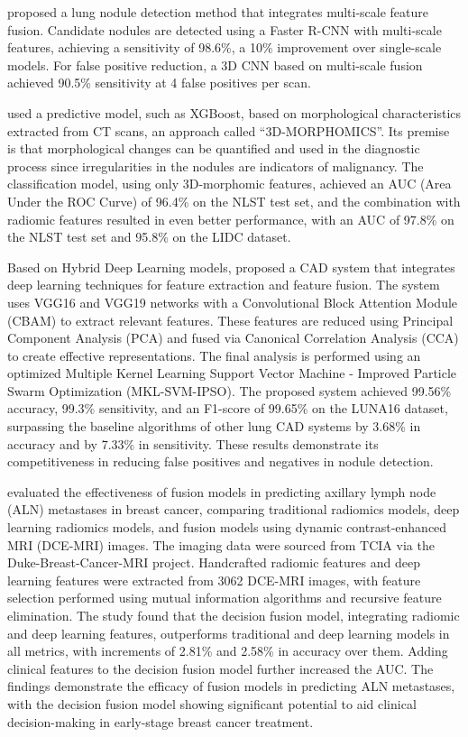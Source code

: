 \citet{Zhao2022} proposed a lung nodule detection method that integrates multi-scale feature fusion. Candidate nodules are detected using a Faster R-CNN with multi-scale features, achieving a sensitivity of 98.6\%, a 10\% improvement over single-scale models. For false positive reduction, a 3D CNN based on multi-scale fusion achieved 90.5\% sensitivity at 4 false positives per scan.


\citet{Munoz2022} used a predictive model, such as XGBoost, based on morphological characteristics extracted from CT scans, an approach called “3D-MORPHOMICS”. Its premise is that morphological changes can be quantified and used in the diagnostic process since irregularities in the nodules are indicators of malignancy. The classification model, using only 3D-morphomic features, achieved an AUC (Area Under the ROC Curve) of 96.4\% on the NLST test set, and the combination with radiomic features resulted in even better performance, with an AUC of 97.8\% on the NLST test set and 95.8\% on the LIDC dataset.

Based on Hybrid Deep Learning models, \citet{Li2022} proposed a CAD system that integrates deep learning techniques for feature extraction and feature fusion. The system uses VGG16 and VGG19 networks with a Convolutional Block Attention Module (CBAM) to extract relevant features. These features are reduced using Principal Component Analysis (PCA) and fused via Canonical Correlation Analysis (CCA) to create effective representations. The final analysis is performed using an optimized Multiple Kernel Learning Support Vector Machine - Improved Particle Swarm Optimization (MKL-SVM-IPSO). The proposed system achieved 99.56\% accuracy, 99.3\% sensitivity, and an F1-score of 99.65\% on the LUNA16 dataset, surpassing the baseline algorithms of other lung CAD systems by 3.68\% in accuracy and by 7.33\% in sensitivity. These results demonstrate its competitiveness in reducing false positives and negatives in nodule detection.

\citet{XueLi2022} evaluated the effectiveness of fusion models in predicting axillary lymph node (ALN) metastases in breast cancer, comparing traditional radiomics models, deep learning radiomics models, and fusion models using dynamic contrast-enhanced MRI (DCE-MRI) images. The imaging data were sourced from TCIA via the Duke-Breast-Cancer-MRI project. Handcrafted radiomic features and deep learning features were extracted from 3062 DCE-MRI images, with feature selection performed using mutual information algorithms and recursive feature elimination. The study found that the decision fusion model, integrating radiomic and deep learning features, outperforms traditional and deep learning models in all metrics, with increments of 2.81\% and 2.58\% in accuracy over them.
Adding clinical features to the decision fusion model further increased the AUC. The findings demonstrate the efficacy of fusion models in predicting ALN metastases, with the decision fusion model showing significant potential to aid clinical decision-making in early-stage breast cancer treatment.

